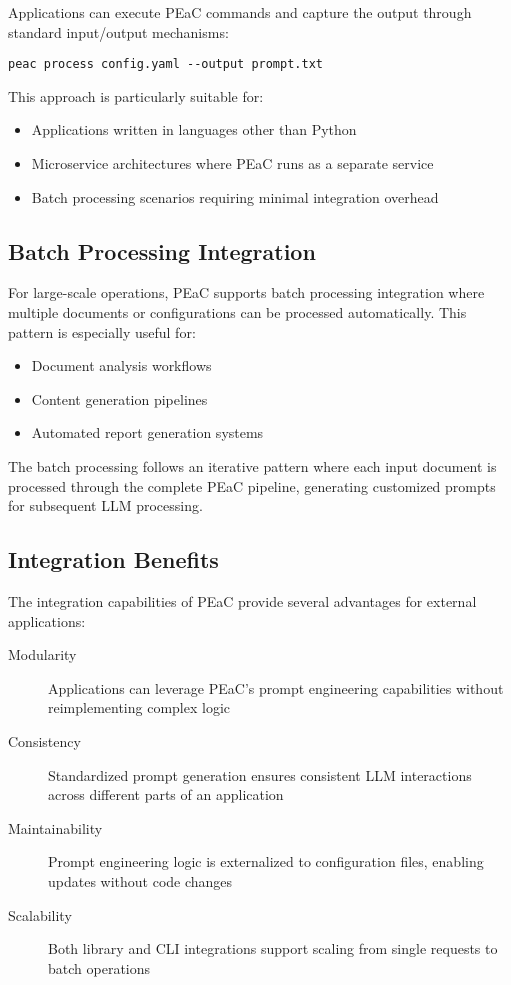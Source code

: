 Applications can execute PEaC commands and capture the output through standard input/output mechanisms:

\begin{verbatim}
peac process config.yaml --output prompt.txt
\end{verbatim}

This approach is particularly suitable for:
\begin{itemize}
    \item Applications written in languages other than Python
    \item Microservice architectures where PEaC runs as a separate service
    \item Batch processing scenarios requiring minimal integration overhead
\end{itemize}

\subsection{Batch Processing Integration}

For large-scale operations, PEaC supports batch processing integration where multiple documents or configurations can be processed automatically. This pattern is especially useful for:

\begin{itemize}
    \item Document analysis workflows
    \item Content generation pipelines
    \item Automated report generation systems
\end{itemize}

The batch processing follows an iterative pattern where each input document is processed through the complete PEaC pipeline, generating customized prompts for subsequent LLM processing.

\subsection{Integration Benefits}

The integration capabilities of PEaC provide several advantages for external applications:

\begin{description}
    \item[Modularity] Applications can leverage PEaC's prompt engineering capabilities without reimplementing complex logic
    \item[Consistency] Standardized prompt generation ensures consistent LLM interactions across different parts of an application
    \item[Maintainability] Prompt engineering logic is externalized to configuration files, enabling updates without code changes
    \item[Scalability] Both library and CLI integrations support scaling from single requests to batch operations
\end{description}

